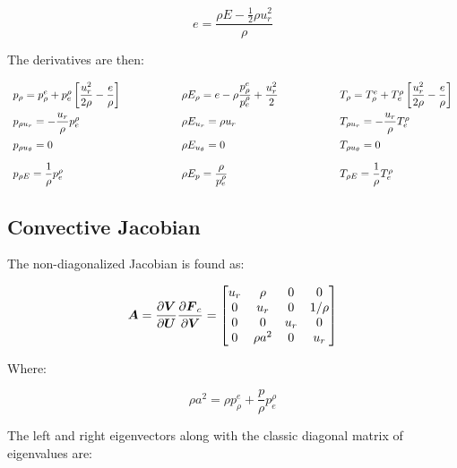 \documentclass[10pt]{article}
\begin{document}
\begin{flushleft}
\begin{equation*}
    e = \frac{\rho E - \frac{1}{2} \rho u_r^2}{\rho}
\end{equation*}

The derivatives are then:

\begin{equation*}
\begin{array}{l@{\hspace{2cm}}l@{\hspace{2cm}}l} 
p_{\rho} = p_\rho^e + p_e^\rho \left[\dfrac{u_r^2}{2\rho} - \dfrac{e}{\rho}\right]
&
\rho E_{\rho} = e - \rho\dfrac{p_\rho^e}{p_e^\rho} + \dfrac{u_r^2}{2}
&
T_{\rho} = T_\rho^e + T_e^\rho \left[\dfrac{u_r^2}{2\rho} - \dfrac{e}{\rho}\right]
\\[10pt]
p_{\rho u_r} = -\dfrac{u_r}{\rho} p_e^\rho
&
\rho E_{u_r} = \rho u_r
&
T_{\rho u_r} = -\dfrac{u_r}{\rho} T_e^\rho
\\[10pt]
p_{\rho u_\theta} = 0
&
\rho E_{u_\theta} = 0
&
T_{\rho u_\theta} = 0
\\[10pt]
p_{\rho E} = \dfrac{1}{\rho} p_e^\rho
&
\rho E_{p} = \dfrac{\rho}{p_e^\rho}
&
T_{\rho E} = \dfrac{1}{\rho} T_e^\rho
\end{array}
\end{equation*}

\subsection{Convective Jacobian}
The non-diagonalized Jacobian is found as:

\begin{equation*}
    \boldsymbol{A} = \frac{\partial \boldsymbol{V}}{\partial \boldsymbol{U}} \frac{\partial \boldsymbol{F}_c}{\partial \boldsymbol{V}} = \begin{bmatrix}
        u_r & \rho & 0 & 0 \\
        0 & u_r & 0 & 1/\rho \\
        0 & 0 & u_r & 0 \\
        0 & \rho a^2 & 0 & u_r
    \end{bmatrix}
\end{equation*}

Where:

\begin{equation*}
    \rho a^2 = \rho p_\rho^e + \frac{p}{\rho} p_e^\rho
\end{equation*}

The left and right eigenvectors along with the classic diagonal matrix of eigenvalues are:


\end{flushleft}
\end{document}
